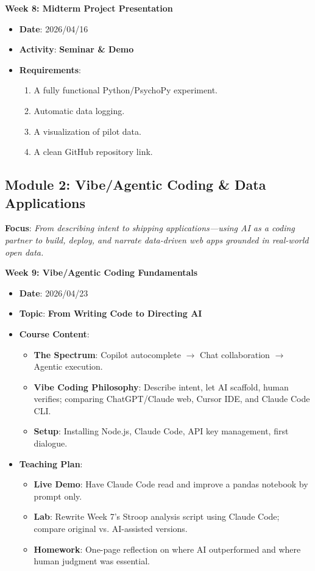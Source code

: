 \noindent\textbf{Week 8: Midterm Project Presentation}
\begin{itemize}
    \item \textbf{Date}: 2026/04/16
    \item \textbf{Activity}: \textbf{Seminar \& Demo}
    \item \textbf{Requirements}:
    \begin{enumerate}
        \item A fully functional Python/PsychoPy experiment.
        \item Automatic data logging.
        \item A visualization of pilot data.
        \item A clean GitHub repository link.
    \end{enumerate}
\end{itemize}

\subsection*{Module 2: Vibe/Agentic Coding \& Data Applications}

\noindent\textbf{Focus}: \textit{From describing intent to shipping applications—using AI as a coding partner to build, deploy, and narrate data-driven web apps grounded in real-world open data.}

\vspace{0.3cm}

\noindent\textbf{Week 9: Vibe/Agentic Coding Fundamentals}
\begin{itemize}
    \item \textbf{Date}: 2026/04/23
    \item \textbf{Topic}: \textbf{From Writing Code to Directing AI}
    \item \textbf{Course Content}:
    \begin{itemize}
        \item \textbf{The Spectrum}: Copilot autocomplete $\rightarrow$ Chat collaboration $\rightarrow$ Agentic execution.
        \item \textbf{Vibe Coding Philosophy}: Describe intent, let AI scaffold, human verifies; comparing ChatGPT/Claude web, Cursor IDE, and Claude Code CLI.
        \item \textbf{Setup}: Installing Node.js, Claude Code, API key management, first dialogue.
    \end{itemize}
    \item \textbf{Teaching Plan}:
    \begin{itemize}
        \item \textbf{Live Demo}: Have Claude Code read and improve a pandas notebook by prompt only.
        \item \textbf{Lab}: Rewrite Week 7's Stroop analysis script using Claude Code; compare original vs. AI-assisted versions.
        \item \textbf{Homework}: One-page reflection on where AI outperformed and where human judgment was essential.
    \end{itemize}
\end{itemize}

